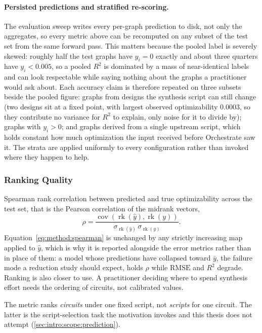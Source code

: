 \paragraph{Persisted predictions and stratified re-scoring.}
The evaluation sweep writes every per-graph prediction to disk, not only the aggregates, so
every metric above can be recomputed on any subset of the test set from the same forward
pass. This matters because the pooled label is severely skewed: roughly half the test
graphs have $y_i = 0$ exactly and about three quarters have $y_i < 0.005$, so a pooled
$R^2$ is dominated by a mass of near-identical labels and can look respectable while saying
nothing about the graphs a practitioner would ask about. Each accuracy claim is therefore
repeated on three subsets beside the pooled figure: graphs from designs the synthesis
script can still change (two designs sit at a fixed point, with largest observed
optimizability $0.0003$, so they contribute no variance for $R^2$ to explain, only noise
for it to divide by); graphs with $y_i > 0$; and graphs derived from a single upstream
script, which holds constant how much optimization the input received before Orchestrate
saw it. The strata are applied uniformly to every configuration rather than invoked where
they happen to help.

\subsubsection{Ranking Quality}
\label{sec:method:experiment:metrics:ranking}
Spearman rank correlation between predicted and true optimizability across the test set,
that is the Pearson correlation of the midrank vectors,
\begin{equation}
    \rho = \frac{\operatorname{cov}\!\left( \operatorname{rk}(\hat{y}),
        \operatorname{rk}(y) \right)}
        {\sigma_{\operatorname{rk}(\hat{y})} \, \sigma_{\operatorname{rk}(y)}}.
    \label{eq:method:spearman}
\end{equation}
Equation~\eqref{eq:method:spearman} is unchanged by any strictly increasing map applied to
$\hat{y}$, which is why it is reported alongside the error metrics rather than in place of
them: a model whose predictions have collapsed toward $\bar{y}$, the failure mode a
reduction study should expect, holds $\rho$ while $\mathrm{RMSE}$ and $R^2$ degrade.
Ranking is also closer to use. A practitioner deciding where to spend synthesis effort
needs the ordering of circuits, not calibrated values.

The metric ranks \emph{circuits} under one fixed script, not \emph{scripts} for one
circuit. The latter is the script-selection task the motivation invokes and this thesis
does not attempt (\ref{sec:intro:scope:prediction}).


